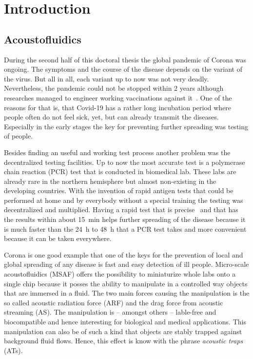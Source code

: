 \chapter{Introduction\label{ch:intro}}
\section{Acoustofluidics}

During the second half of this doctoral thesis the global pandemic of Corona 
was ongoing. The symptoms and the course of the disease depends on the variant 
of the virus. But all in all, each variant up to now was not very deadly. 
Nevertheless, the pandemic could not be stopped within 2 years although 
researches managed to engineer working vaccinations against 
it~\cite{Polack2020,Mahase2020,Voysey2021}. One of the reasons for that is, 
that Covid-19 has a rather long incubation period where people often do not 
feel sick, yet, but can already transmit the diseases. Especially in the early 
stages the key for preventing further spreading was testing of people.

Besides finding an useful and working test process another problem was the 
decentralized testing facilities. Up to now the most accurate test is a 
polymerase chain reaction (PCR) test that is conducted in biomedical lab. These 
labs are already rare in the northern hemisphere but almost non-existing in the 
developing countries. With the invention of rapid antigen tests that could be 
performed at home and by everybody without a special training the testing was 
decentralized and multiplied. Having a rapid test that is 
precise~\cite{Albert2021} and that has the results within about 
\SI{15}{\minute} helps further spreading of the disease because it is much 
faster than the \SI{24}{\hour} to \SI{48}{\hour} that a PCR test takes and more 
convenient because it can be taken everywhere.

Corona is one good example that one of the keys for the prevention of local and 
global spreading of any disease is fast and easy detection of ill people. 
Micro-scale acoustofluidics (MSAF) offers the possibility to miniaturize whole 
labs onto a single chip because it posses the ability to manipulate in a 
controlled way objects that are immersed in a fluid. The two main forces 
causing the manipulation is the so called acoustic radiation force (ARF) and 
the drag force from acoustic streaming (AS). The manipulation is -- amongst 
others -- lable-free and biocompatible and hence interesting for biological and 
medical applications. This manipulation can also be of such a kind that objects 
are stably trapped against background fluid flows. Hence, this effect is know 
with the phrase \emph{acoustic traps} (ATs).


